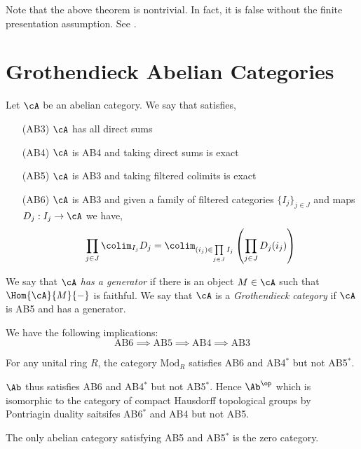 \documentclass[12pt]{article}
\begin{document}
\begin{rmk}
Note that the above theorem is nontrivial. In fact, it is false without the finite presentation assumption. See .
\end{rmk}

\section{Grothendieck Abelian Categories}

\begin{defn}
Let $\cA$ be an abelian category. We say that satisfies,
\begin{enumerate}
\item[(AB3)] $\cA$ has all direct sums
\item[(AB4)] $\cA$ is AB4 and taking direct sums is exact
\item[(AB5)] $\cA$ is AB3 and taking filtered colimits is exact
\item[(AB6)] $\cA$ is AB3 and given a family of filtered categories $\{ I_j \}_{j \in J}$ and maps $D_j : I_j \to \cA$ we have,
\[ \prod_{j \in J} \colim_{I_j} D_j = \colim_{(i_j) \in \prod\limits_{j \in J} I_j} \left( \prod_{j \in J} D_j(i_j) \right) \]
\end{enumerate}
We say that $\cA$ \textit{has a generator} if there is an object $M \in \cA$ such that $\Hom{\cA}{M}{-}$ is faithful. We say that $\cA$ is a \textit{Grothendieck category} if $\cA$ is AB5 and has a generator.
\end{defn}

\begin{lemma}
We have the following implications:
\[ \text{AB6} \implies \text{AB5} \implies \text{AB4} \implies \text{AB3} \]
\end{lemma}

\begin{lemma}
For any unital ring $R$, the category $\mathrm{Mod}_R$ satisfies AB6 and AB4$^*$ but not AB5$^*$.
\end{lemma}

\begin{example}
$\Ab$ thus satisfies AB6 and AB4$^*$ but not AB5$^*$. Hence $\Ab^\op$ which is isomorphic to the category of compact Hausdorff topological groups by Pontriagin duality saitsifes AB6$^*$ and AB4 but not AB5. 
\end{example}

\begin{lemma}
The only abelian category satisfying AB5 and AB5$^*$ is the zero category. 
\end{lemma}
\end{document}
